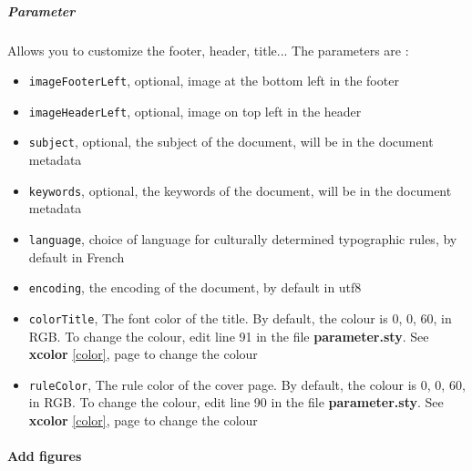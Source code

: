 \subparagraph{Parameter}
Allows you to customize the footer, header, title...
The parameters are :
\begin{itemize}
    \item \texttt{imageFooterLeft}, optional, image at the bottom left in the footer
    \item \texttt{imageHeaderLeft}, optional, image on top left in the header
    \item \texttt{subject}, optional, the subject of the document, will be in the
          document metadata
    \item \texttt{keywords}, optional, the keywords of the document, will be in the
          document metadata
    \item \texttt{language}, choice of language for culturally determined typographic
          rules, by default in French \label{language}
    \item \texttt{encoding}, the encoding of the document, by default in utf8
    \item \texttt{colorTitle}, The font color of the title. By default, the colour is
          0, 0, 60, in RGB. To change the colour, edit line 91 in the file \textbf{parameter.sty}.
          See \textbf{xcolor} \ref{color}, page \pageref{color} to change the colour
    \item \texttt{ruleColor}, The rule color of the cover page. By default, the colour is
          0, 0, 60, in RGB. To change the colour, edit line 90 in the file \textbf{parameter.sty}.
          See \textbf{xcolor} \ref{color}, page \pageref{color} to change the colour
\end{itemize}

\paragraph{Add figures}


